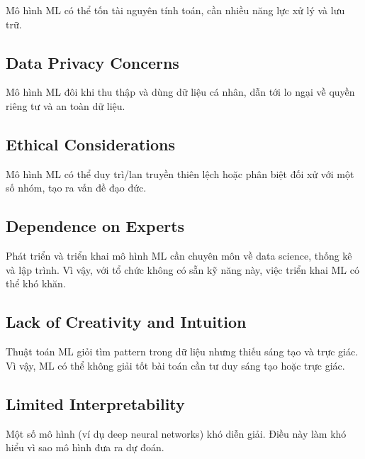 \begin{dinhnghia}[title={Chi phí tính toán cao}]
Mô hình ML có thể tốn tài nguyên tính toán, cần nhiều năng lực xử lý và lưu trữ.
\end{dinhnghia}

\subsection{Data Privacy Concerns}

\begin{dinhnghia}[title={Lo ngại về quyền riêng tư dữ liệu}]
Mô hình ML đôi khi thu thập và dùng dữ liệu cá nhân, dẫn tới lo ngại về quyền riêng tư và an toàn dữ liệu.
\end{dinhnghia}

\subsection{Ethical Considerations}

\begin{dinhnghia}[title={Vấn đề đạo đức}]
Mô hình ML có thể duy trì/lan truyền thiên lệch hoặc phân biệt đối xử với một số nhóm, tạo ra vấn đề đạo đức.
\end{dinhnghia}

\subsection{Dependence on Experts}

\begin{dinhnghia}[title={Phụ thuộc vào chuyên gia}]
Phát triển và triển khai mô hình ML cần chuyên môn về data science, thống kê và lập trình.
Vì vậy, với tổ chức không có sẵn kỹ năng này, việc triển khai ML có thể khó khăn.
\end{dinhnghia}

\subsection{Lack of Creativity and Intuition}

\begin{dinhnghia}[title={Thiếu sáng tạo và trực giác}]
Thuật toán ML giỏi tìm pattern trong dữ liệu nhưng thiếu sáng tạo và trực giác.
Vì vậy, ML có thể không giải tốt bài toán cần tư duy sáng tạo hoặc trực giác.
\end{dinhnghia}

\subsection{Limited Interpretability}

\begin{dinhnghia}[title={Khả năng diễn giải hạn chế}]
Một số mô hình (ví dụ deep neural networks) khó diễn giải.
Điều này làm khó hiểu vì sao mô hình đưa ra dự đoán.
\end{dinhnghia}